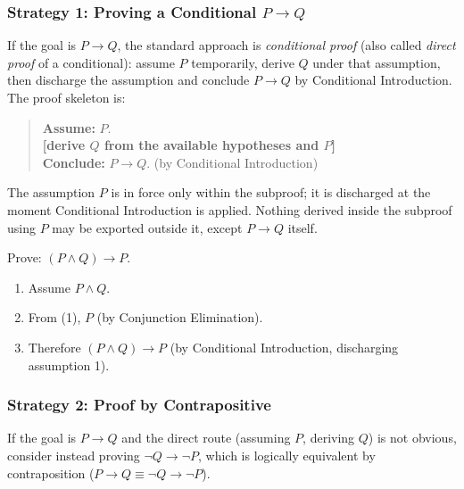 \subsubsection*{Strategy 1: Proving a Conditional $P \to Q$}

If the goal is $P \to Q$, the standard approach is \emph{conditional proof}
(also called \emph{direct proof} of a conditional): assume $P$ temporarily,
derive $Q$ under that assumption, then discharge the assumption and conclude
$P \to Q$ by Conditional Introduction. The proof skeleton is:

\begin{quote}
\textbf{Assume:} $P$. \\
\textbf{[derive $Q$ from the available hypotheses and $P$]} \\
\textbf{Conclude:} $P \to Q$. \quad (by Conditional Introduction)
\end{quote}

The assumption $P$ is in force only within the subproof; it is discharged at
the moment Conditional Introduction is applied. Nothing derived inside the
subproof using $P$ may be exported outside it, except $P \to Q$ itself.

\begin{example}
Prove: $(P \wedge Q) \to P$.

\begin{enumerate}
\item Assume $P \wedge Q$.
\item From (1), $P$ \quad (by Conjunction Elimination).
\item Therefore $(P \wedge Q) \to P$ \quad (by Conditional Introduction, discharging assumption 1).
\end{enumerate}
\end{example}


\subsubsection*{Strategy 2: Proof by Contrapositive}

If the goal is $P \to Q$ and the direct route (assuming $P$, deriving $Q$) is
not obvious, consider instead proving $\neg Q \to \neg P$, which is logically
equivalent by contraposition ($P \to Q \equiv \neg Q \to \neg P$).

